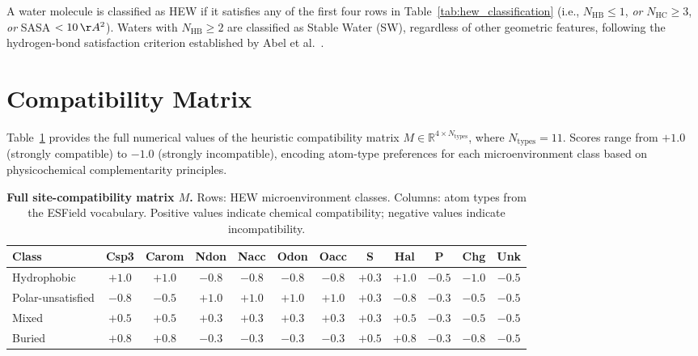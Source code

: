 \documentclass{article}
\begin{document}
A water molecule is classified as HEW if it satisfies any of the first four
rows in Table~\ref{tab:hew_classification} (i.e., $N_{\text{HB}} \le 1$,
\emph{or} $N_{\text{HC}} \ge 3$, \emph{or} SASA $< 10\,\AA^2$).  Waters with
$N_{\text{HB}} \ge 2$ are classified as Stable Water (SW), regardless of
other geometric features, following the hydrogen-bond satisfaction criterion
established by Abel et al.~\cite{abel2008}.

\section{Compatibility Matrix}
\label{app:compat_matrix}

Table~\ref{tab:compat_matrix_full} provides the full numerical values of the
heuristic compatibility matrix $M \in \mathbb{R}^{4 \times N_{\text{types}}}$,
where $N_{\text{types}} = 11$.  Scores range from $+1.0$ (strongly compatible)
to $-1.0$ (strongly incompatible), encoding atom-type preferences for each
microenvironment class based on physicochemical complementarity principles.

\begin{table}[H]
  \centering
  \caption{\textbf{Full site-compatibility matrix $M$.}
    Rows: HEW microenvironment classes.  Columns: atom types from the
    ESField vocabulary.  Positive values indicate chemical compatibility;
    negative values indicate incompatibility.}
  \label{tab:compat_matrix_full}
  \small
  \begin{tabular}{l c c c c c c c c c c c}
    \toprule
    \textbf{Class} & \textbf{Csp3} & \textbf{Carom} & \textbf{Ndon} & \textbf{Nacc}
    & \textbf{Odon} & \textbf{Oacc} & \textbf{S} & \textbf{Hal}
    & \textbf{P} & \textbf{Chg} & \textbf{Unk} \\
    \midrule
    Hydrophobic       & $+1.0$ & $+1.0$ & $-0.8$ & $-0.8$ & $-0.8$ & $-0.8$ & $+0.3$ & $+1.0$ & $-0.5$ & $-1.0$ & $-0.5$ \\
    Polar-unsatisfied & $-0.8$ & $-0.5$ & $+1.0$ & $+1.0$ & $+1.0$ & $+1.0$ & $+0.3$ & $-0.8$ & $-0.3$ & $-0.5$ & $-0.5$ \\
    Mixed             & $+0.5$ & $+0.5$ & $+0.3$ & $+0.3$ & $+0.3$ & $+0.3$ & $+0.3$ & $+0.5$ & $-0.3$ & $-0.5$ & $-0.5$ \\
    Buried            & $+0.8$ & $+0.8$ & $-0.3$ & $-0.3$ & $-0.3$ & $-0.3$ & $+0.5$ & $+0.8$ & $-0.3$ & $-0.8$ & $-0.5$ \\
    \bottomrule
  \end{tabular}
\end{table}
\end{document}
